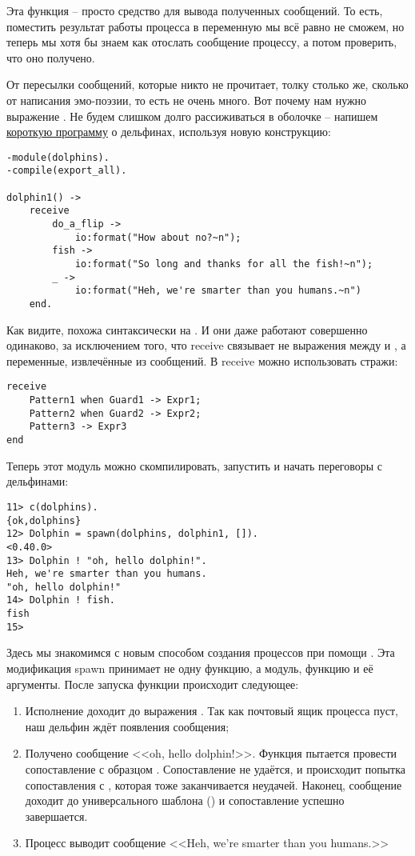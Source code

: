 Эта функция \--- просто средство для вывода полученных сообщений.
То есть, поместить результат работы процесса в переменную мы всё равно не сможем, но теперь мы хотя бы знаем как отослать сообщение процессу, а потом проверить, что оно получено.

От пересылки сообщений, которые никто не прочитает, толку столько же, сколько от написания эмо\--поэзии, то есть не очень много.
Вот почему нам нужно выражение .
Не будем слишком долго рассиживаться в оболочке \--- напишем  \href{http://learnyousomeerlang.com/static/erlang/dolphins.erl}{короткую программу} о дельфинах, используя новую конструкцию:
\begin{lstlisting}[style=erlang]
-module(dolphins).
-compile(export_all).
 
dolphin1() ->
    receive
        do_a_flip ->
            io:format("How about no?~n");
        fish ->
            io:format("So long and thanks for all the fish!~n");
        _ ->
            io:format("Heh, we're smarter than you humans.~n")
    end.
\end{lstlisting}

Как видите,  похожа синтаксически на .
И они даже работают совершенно одинаково, за исключением того, что receive связывает не выражения между  и , а переменные, извлечённые из сообщений.
В receive можно использовать стражи:
\begin{lstlisting}[style=erlang]
receive
    Pattern1 when Guard1 -> Expr1;
    Pattern2 when Guard2 -> Expr2;
    Pattern3 -> Expr3
end
\end{lstlisting}

Теперь этот модуль можно скомпилировать, запустить и начать переговоры с дельфинами:
\begin{lstlisting}[style=erlang]
11> c(dolphins).
{ok,dolphins}
12> Dolphin = spawn(dolphins, dolphin1, []).
<0.40.0>
13> Dolphin ! "oh, hello dolphin!".
Heh, we're smarter than you humans.
"oh, hello dolphin!"
14> Dolphin ! fish.               
fish
15>
\end{lstlisting}

Здесь мы знакомимся с новым способом создания процессов при помощи .
Эта модификация spawn принимает не одну функцию, а модуль, функцию и её аргументы.
После запуска функции происходит следующее:
\begin{enumerate}
    \item Исполнение доходит до выражения .
Так как почтовый ящик процесса пуст, наш дельфин ждёт появления сообщения;
\item Получено сообщение <<oh, hello dolphin!>>.
Функция пытается провести сопоставление с образцом .
Сопоставление не удаётся, и происходит попытка сопоставления с , которая тоже заканчивается неудачей.
Наконец, сообщение доходит до универсального шаблона (\ops{\strut\_}) и сопоставление успешно завершается.
\item Процесс выводит сообщение <<Heh, we're smarter than you humans.>>
\end{enumerate}

